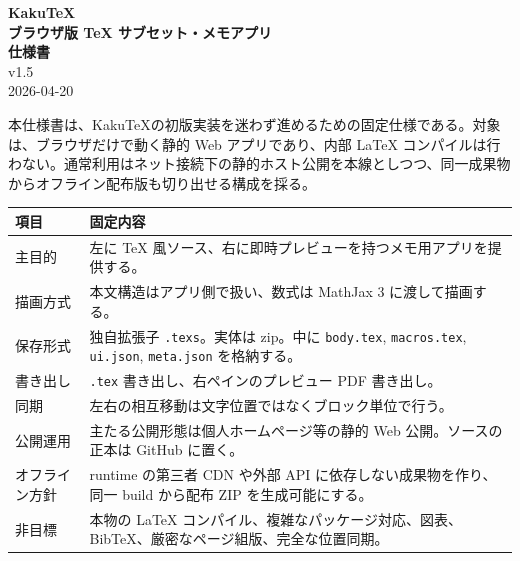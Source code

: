 \documentclass[11pt,a4paper]{ltjsarticle}
\newcommand{\code}[1]{\texttt{#1}}
\newcommand{\appname}{KakuTeX}
\newcommand{\texs}{\code{.texs}}
\begin{document}
\begin{titlepage}
\thispagestyle{empty}
{\sffamily\color{AccentDark}
\vspace*{1.6cm}

{\fontsize{26}{30}\selectfont\bfseries \appname}\\[0.35em]
{\fontsize{24}{28}\selectfont\bfseries ブラウザ版 TeX サブセット・メモアプリ}\\[0.5em]
{\fontsize{22}{26}\selectfont\bfseries 仕様書}\\[0.9em]

{\Large v1.5}\\[0.5em]
{\large 2026-04-20}
}

\vspace{1.1cm}

\begin{decisionbox}[文書の位置付け]
本仕様書は、\appname の初版実装を迷わず進めるための固定仕様である。対象は、ブラウザだけで動く静的 Web アプリであり、内部 LaTeX コンパイルは行わない。通常利用はネット接続下の静的ホスト公開を本線としつつ、同一成果物からオフライン配布版も切り出せる構成を採る。
\end{decisionbox}

\vspace{0.4cm}

\begin{tabularx}{\textwidth}{L{0.22\textwidth}Y}
\toprule
{}
\textbf{項目} & \textbf{固定内容} \\
\midrule
主目的 & 左に TeX 風ソース、右に即時プレビューを持つメモ用アプリを提供する。\\
描画方式 & 本文構造はアプリ側で扱い、数式は MathJax 3 に渡して描画する。\\
保存形式 & 独自拡張子 \texs。実体は zip。中に \code{body.tex}, \code{macros.tex}, \code{ui.json}, \code{meta.json} を格納する。\\
書き出し & \code{.tex} 書き出し、右ペインのプレビュー PDF 書き出し。\\
同期 & 左右の相互移動は文字位置ではなくブロック単位で行う。\\
公開運用 & 主たる公開形態は個人ホームページ等の静的 Web 公開。ソースの正本は GitHub に置く。\\
オフライン方針 & runtime の第三者 CDN や外部 API に依存しない成果物を作り、同一 build から配布 ZIP を生成可能にする。\\
非目標 & 本物の LaTeX コンパイル、複雑なパッケージ対応、図表、BibTeX、厳密なページ組版、完全な位置同期。\\
\bottomrule
\end{tabularx}


\end{titlepage}
\end{document}
